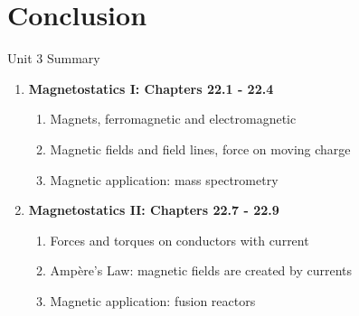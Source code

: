 \documentclass{beamer}
\begin{document}

\section{Conclusion}

\begin{frame}{Unit 3 Summary}
\begin{enumerate}
\item \textbf{Magnetostatics I: Chapters 22.1 - 22.4}
\begin{enumerate}
\item Magnets, ferromagnetic and electromagnetic
\item Magnetic fields and field lines, force on moving charge
\item Magnetic application: \alert{mass spectrometry}
\end{enumerate}
\item \textbf{Magnetostatics II: Chapters 22.7 - 22.9}
\begin{enumerate}
\item Forces and torques on conductors with current
\item Amp\`{e}re's Law: magnetic fields are created by currents
\item Magnetic application: \alert{fusion reactors}
\end{enumerate}
\end{enumerate}
\end{frame}
\end{document}
